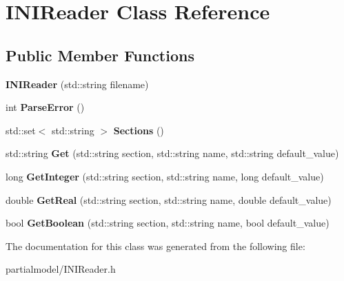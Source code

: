 \hypertarget{classINIReader}{}\section{I\+N\+I\+Reader Class Reference}
\label{classINIReader}
\subsection*{Public Member Functions}
\begin{DoxyCompactItemize}
\item 
{\bfseries I\+N\+I\+Reader} (std\+::string filename)\hypertarget{classINIReader_a357e21f6b1bc10b17bd3a7b72452cb57}{}\label{classINIReader_a357e21f6b1bc10b17bd3a7b72452cb57}

\item 
int {\bfseries Parse\+Error} ()\hypertarget{classINIReader_aaecb5fce7bfeac1710b3a7d5f7ec94ab}{}\label{classINIReader_aaecb5fce7bfeac1710b3a7d5f7ec94ab}

\item 
std\+::set$<$ std\+::string $>$ {\bfseries Sections} ()\hypertarget{classINIReader_a8dc6b10ba3415f3c30c30c4fc342d867}{}\label{classINIReader_a8dc6b10ba3415f3c30c30c4fc342d867}

\item 
std\+::string {\bfseries Get} (std\+::string section, std\+::string name, std\+::string default\+\_\+value)\hypertarget{classINIReader_a1042bfbb483afa305283a6f1a2bf27e9}{}\label{classINIReader_a1042bfbb483afa305283a6f1a2bf27e9}

\item 
long {\bfseries Get\+Integer} (std\+::string section, std\+::string name, long default\+\_\+value)\hypertarget{classINIReader_a5fb288f961b8a43ba4974fbf97f4d1df}{}\label{classINIReader_a5fb288f961b8a43ba4974fbf97f4d1df}

\item 
double {\bfseries Get\+Real} (std\+::string section, std\+::string name, double default\+\_\+value)\hypertarget{classINIReader_add45ae10b48fd12cb98a7b73e67d3a77}{}\label{classINIReader_add45ae10b48fd12cb98a7b73e67d3a77}

\item 
bool {\bfseries Get\+Boolean} (std\+::string section, std\+::string name, bool default\+\_\+value)\hypertarget{classINIReader_ac3d70858d357a6797b0d58a9a00d737e}{}\label{classINIReader_ac3d70858d357a6797b0d58a9a00d737e}

\end{DoxyCompactItemize}


The documentation for this class was generated from the following file\+:\begin{DoxyCompactItemize}
\item 
partialmodel/I\+N\+I\+Reader.\+h\end{DoxyCompactItemize}
